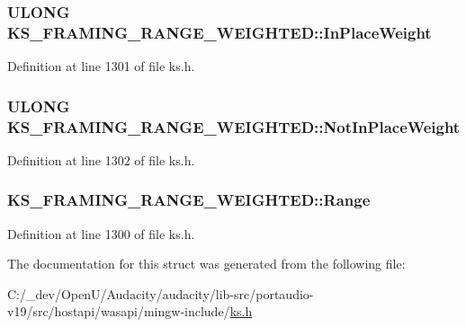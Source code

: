 \subsubsection[{\texorpdfstring{In\+Place\+Weight}{InPlaceWeight}}]{\setlength{\rightskip}{0pt plus 5cm}U\+L\+O\+NG K\+S\+\_\+\+F\+R\+A\+M\+I\+N\+G\+\_\+\+R\+A\+N\+G\+E\+\_\+\+W\+E\+I\+G\+H\+T\+E\+D\+::\+In\+Place\+Weight}\hypertarget{struct_k_s___f_r_a_m_i_n_g___r_a_n_g_e___w_e_i_g_h_t_e_d_ad4a6c1ca2a0c4d359227df608943fbce}{}\label{struct_k_s___f_r_a_m_i_n_g___r_a_n_g_e___w_e_i_g_h_t_e_d_ad4a6c1ca2a0c4d359227df608943fbce}


Definition at line 1301 of file ks.\+h.

\subsubsection[{\texorpdfstring{Not\+In\+Place\+Weight}{NotInPlaceWeight}}]{\setlength{\rightskip}{0pt plus 5cm}U\+L\+O\+NG K\+S\+\_\+\+F\+R\+A\+M\+I\+N\+G\+\_\+\+R\+A\+N\+G\+E\+\_\+\+W\+E\+I\+G\+H\+T\+E\+D\+::\+Not\+In\+Place\+Weight}\hypertarget{struct_k_s___f_r_a_m_i_n_g___r_a_n_g_e___w_e_i_g_h_t_e_d_af23bb8f865862ffe083460cc17c91589}{}\label{struct_k_s___f_r_a_m_i_n_g___r_a_n_g_e___w_e_i_g_h_t_e_d_af23bb8f865862ffe083460cc17c91589}


Definition at line 1302 of file ks.\+h.

\subsubsection[{\texorpdfstring{Range}{Range}}]{ K\+S\+\_\+\+F\+R\+A\+M\+I\+N\+G\+\_\+\+R\+A\+N\+G\+E\+\_\+\+W\+E\+I\+G\+H\+T\+E\+D\+::\+Range}\hypertarget{struct_k_s___f_r_a_m_i_n_g___r_a_n_g_e___w_e_i_g_h_t_e_d_a55d3e79af39381b05c100b5627cf31eb}{}\label{struct_k_s___f_r_a_m_i_n_g___r_a_n_g_e___w_e_i_g_h_t_e_d_a55d3e79af39381b05c100b5627cf31eb}


Definition at line 1300 of file ks.\+h.



The documentation for this struct was generated from the following file\+:\begin{DoxyCompactItemize}
\item 
C\+:/\+\_\+dev/\+Open\+U/\+Audacity/audacity/lib-\/src/portaudio-\/v19/src/hostapi/wasapi/mingw-\/include/\hyperlink{ks_8h}{ks.\+h}\end{DoxyCompactItemize}
